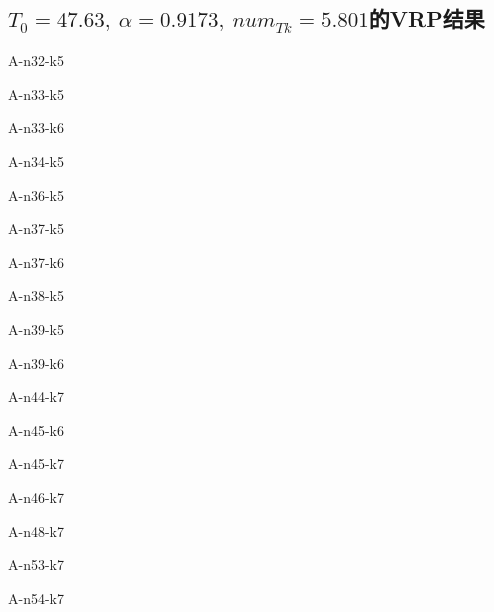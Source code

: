 \documentclass{nudt}
\begin{document}
\begin{appendix}
\section{$T_0=47.63,\ \alpha=0.9173,\ num_{Tk}=5.801$的VRP结果}\label{appendix:bayesVRP}
\noindent{\rule{\textwidth}{0.2mm}}
A-n32-k5
\fontsize{13pt}{12.5pt}\selectfont
{
	
	\noindent{\rule{\textwidth}{0.2mm}}
}
A-n33-k5
\fontsize{13pt}{12.5pt}\selectfont
{
	
	\noindent{\rule{\textwidth}{0.2mm}}
}
A-n33-k6
\fontsize{13pt}{12.5pt}\selectfont
{
	
	\noindent{\rule{\textwidth}{0.2mm}}
}
A-n34-k5
\fontsize{13pt}{12.5pt}\selectfont
{
	
	\noindent{\rule{\textwidth}{0.2mm}}
}
A-n36-k5
\fontsize{13pt}{12.5pt}\selectfont
{
	
	\noindent{\rule{\textwidth}{0.2mm}}
}
A-n37-k5
\fontsize{13pt}{12.5pt}\selectfont
{
	
	\noindent{\rule{\textwidth}{0.2mm}}
}
A-n37-k6
\fontsize{13pt}{12.5pt}\selectfont
{
	
	\noindent{\rule{\textwidth}{0.2mm}}
}
A-n38-k5
\fontsize{13pt}{12.5pt}\selectfont
{
	
	\noindent{\rule{\textwidth}{0.2mm}}
}
A-n39-k5
\fontsize{13pt}{12.5pt}\selectfont
{
	
	\noindent{\rule{\textwidth}{0.2mm}}
}
A-n39-k6
\fontsize{13pt}{12.5pt}\selectfont
{
	
	\noindent{\rule{\textwidth}{0.2mm}}
}
A-n44-k7
\fontsize{13pt}{12.5pt}\selectfont
{
	
	\noindent{\rule{\textwidth}{0.2mm}}
}
A-n45-k6
\fontsize{13pt}{12.5pt}\selectfont
{
	
	\noindent{\rule{\textwidth}{0.2mm}}
}
A-n45-k7
\fontsize{13pt}{12.5pt}\selectfont
{
	
	\noindent{\rule{\textwidth}{0.2mm}}
}
A-n46-k7
\fontsize{13pt}{12.5pt}\selectfont
{
	
	\noindent{\rule{\textwidth}{0.2mm}}
}
A-n48-k7
\fontsize{13pt}{12.5pt}\selectfont
{
	
	\noindent{\rule{\textwidth}{0.2mm}}
}
A-n53-k7
\fontsize{13pt}{12.5pt}\selectfont
{
	
	\noindent{\rule{\textwidth}{0.2mm}}
}
A-n54-k7
\fontsize{13pt}{12.5pt}\selectfont
{
	
}
\end{appendix}
\end{document}
